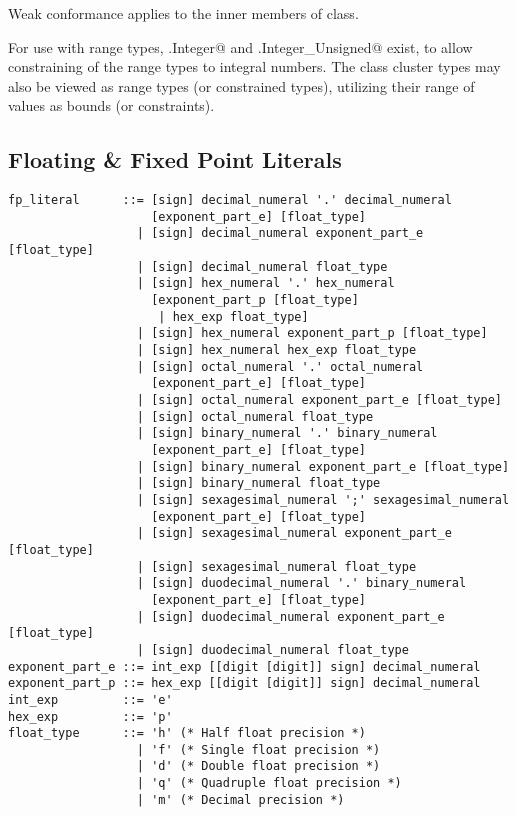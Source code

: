 Weak conformance applies to the inner members of \lstinline@Number@ class. 

For use with range types, \lstinline@Number.Integer@ and \lstinline@Number.Integer_Unsigned@ exist, to allow constraining of the range types to integral numbers. The class cluster types may also be viewed as range types (or constrained types), utilizing their range of values as bounds (or constraints). 






\subsection{Floating \& Fixed Point Literals}
\label{sec:floatliterals}
\label{sec:fixedpointliterals}

\syntax\begin{lstlisting}
fp_literal      ::= [sign] decimal_numeral '.' decimal_numeral
                    [exponent_part_e] [float_type]
                  | [sign] decimal_numeral exponent_part_e [float_type]
                  | [sign] decimal_numeral float_type
                  | [sign] hex_numeral '.' hex_numeral 
                    [exponent_part_p [float_type] 
                     | hex_exp float_type]
                  | [sign] hex_numeral exponent_part_p [float_type]
                  | [sign] hex_numeral hex_exp float_type
                  | [sign] octal_numeral '.' octal_numeral 
                    [exponent_part_e] [float_type]
                  | [sign] octal_numeral exponent_part_e [float_type]
                  | [sign] octal_numeral float_type
                  | [sign] binary_numeral '.' binary_numeral 
                    [exponent_part_e] [float_type]
                  | [sign] binary_numeral exponent_part_e [float_type]
                  | [sign] binary_numeral float_type
                  | [sign] sexagesimal_numeral ';' sexagesimal_numeral
                    [exponent_part_e] [float_type]
                  | [sign] sexagesimal_numeral exponent_part_e [float_type]
                  | [sign] sexagesimal_numeral float_type
                  | [sign] duodecimal_numeral '.' binary_numeral 
                    [exponent_part_e] [float_type]
                  | [sign] duodecimal_numeral exponent_part_e [float_type]
                  | [sign] duodecimal_numeral float_type
exponent_part_e ::= int_exp [[digit [digit]] sign] decimal_numeral
exponent_part_p ::= hex_exp [[digit [digit]] sign] decimal_numeral
int_exp         ::= 'e'
hex_exp         ::= 'p'
float_type      ::= 'h' (* Half float precision *)
                  | 'f' (* Single float precision *)
                  | 'd' (* Double float precision *)
                  | 'q' (* Quadruple float precision *)
                  | 'm' (* Decimal precision *)
\end{lstlisting}

